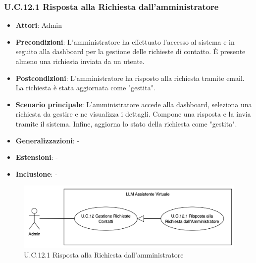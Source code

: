 \subsubsection{U.C.12.1 Risposta alla Richiesta dall'amministratore}
\begin{itemize}
    \item \textbf{Attori}: Admin
    \item \textbf{Precondizioni}: L’amministratore ha effettuato l’accesso al sistema e in seguito alla dashboard per la gestione delle richieste di contatto. È presente almeno una richiesta inviata da un utente.
    \item \textbf{Postcondizioni}: L’amministratore ha risposto alla richiesta tramite email. La richiesta è stata aggiornata come "gestita".
    \item \textbf{Scenario principale}: L’amministratore accede alla dashboard, seleziona una richiesta da gestire e ne visualizza i dettagli. Compone una risposta e la invia tramite il sistema. Infine, aggiorna lo stato della richiesta come "gestita".
    \item \textbf{Generalizzazioni}: -
    \item \textbf{Estensioni}: -
    \item \textbf{Inclusione}: -
\end{itemize}
\begin{figure}[H]
    \centering
    \includegraphics[width=\textwidth]{img/U.C.12.1.png}
    \caption{U.C.12.1 Risposta alla Richiesta dall'amministratore}
\end{figure}
\newpage

